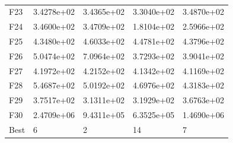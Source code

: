 \documentclass[10pt,a4paper]{article}
\begin{document}
\begin{table}[H]
\begin{center}
\begin{tabular}{lllll}
		F23  &  3.4278e+02 &  3.4365e+02 &  3.3040e+02 &  3.4870e+02 \\
		F24  &  3.4600e+02 &  3.4709e+02 &  1.8104e+02 &  2.5966e+02 \\
		F25  &  4.3480e+02 &  4.6033e+02 &  4.4781e+02 &  4.3796e+02 \\
		F26  &  5.0474e+02 &  7.0964e+02 &  3.7293e+02 &  3.9041e+02 \\
		F27  &  4.1972e+02 &  4.2152e+02 &  4.1342e+02 &  4.1169e+02 \\
		F28  &  5.4687e+02 &  5.0192e+02 &  4.6976e+02 &  4.3183e+02 \\
		F29  &  3.7517e+02 &  3.1311e+02 &  3.1929e+02 &  3.6763e+02 \\
		F30  &  2.4709e+06 &  9.4311e+05 &  6.3525e+05 &  1.4690e+06 \\
		Best &           6 &           2 &          14 &           7 \\

		\bottomrule

	\end{tabular}
		\caption{}
\end{center}	
\end{table}
\end{document}
